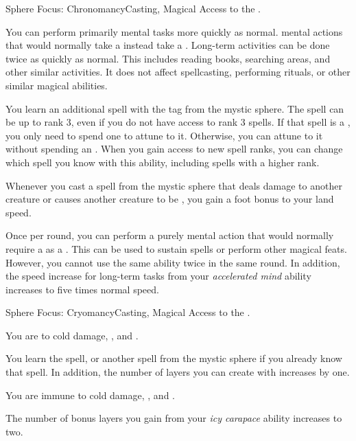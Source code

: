     \begin{magicalfeat}{Sphere Focus: Chronomancy}{Casting, Magical}
        \featpre Access to the  .

         You can perform primarily mental tasks more quickly as normal.
         mental actions that would normally take a  instead take a .
        Long-term activities can be done twice as quickly as normal.
        This includes reading books, searching areas, and other similar activities.
        It does not affect spellcasting, performing rituals, or other similar magical abilities.

         You learn an additional spell with the  tag from the  mystic sphere.
        The spell can be up to rank 3, even if you do not have access to rank 3 spells.
        If that spell is a , you only need to spend one  to attune to it.
        Otherwise, you can attune to it without spending an .
        When you gain access to new spell ranks, you can change which spell you know with this ability, including spells with a higher rank.

         Whenever you cast a spell from the  mystic sphere that deals damage to another creature or causes another creature to be \slowed, you  gain a  foot bonus to your land speed.

         Once per round, you can perform a purely mental action that would normally require a  as a .
        This can be used to sustain spells or perform other magical feats.
        However, you cannot use the same ability twice in the same round.
        In addition, the speed increase for long-term tasks from your \textit{accelerated mind} ability increases to five times normal speed.
    \end{magicalfeat}

    \begin{magicalfeat}{Sphere Focus: Cryomancy}{Casting, Magical}
        \featpre Access to the  .

         You are  to cold damage, , and .

         You learn the  spell, or another spell from the  mystic sphere if you already know that spell.
        In addition, the number of layers you can create with  increases by one.

         You are immune to cold damage, , and .

         The number of bonus layers you gain from your \textit{icy carapace} ability increases to two.
    \end{magicalfeat}

